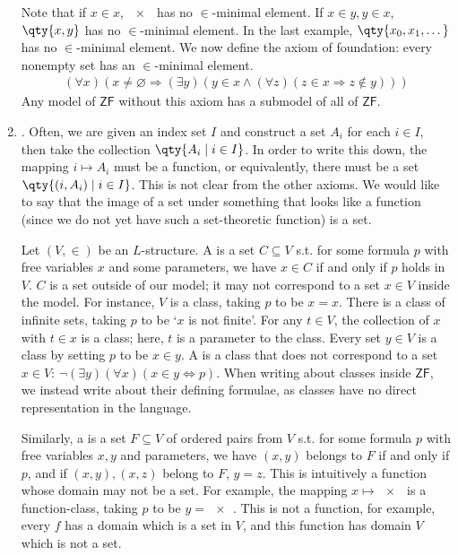 \begin{enumerate}
    Note that if $x \in x$, $\qty{x}$ has no $\in$-minimal element.
    If $x \in y, y \in x$, $\qty{x, y}$ has no $\in$-minimal element.
    In the last example, $\qty{x_0, x_1, \dots}$ has no $\in$-minimal element.
    We now define the axiom of foundation: every nonempty set has an $\in$-minimal element.
    \begin{align*}
        (\forall x)(x \neq \varnothing \Rightarrow (\exists y)(y \in x \wedge (\forall z)(z \in x \Rightarrow z \not\in y)))
    \end{align*}
    Any model of $\mathsf{ZF}$ without this axiom has a submodel of all of $\mathsf{ZF}$.
    \item {}.
    Often, we are given an index set $I$ and construct a set $A_i$ for each $i \in I$, then take the collection $\qty{A_i \mid i \in I}$.
    In order to write this down, the mapping $i \mapsto A_i$ must be a function, or equivalently, there must be a set $\qty{(i, A_i) \mid i \in I}$.
    This is not clear from the other axioms.
    We would like to say that the image of a set under something that looks like a function (since we do not yet have such a set-theoretic function) is a set.

    Let $(V, \in)$ be an $L$-structure.
    A  is a set $C \subseteq V$ s.t. for some formula $p$ with free variables $x$ and some parameters, we have $x \in C$ if and only if $p$ holds in $V$.
    $C$ is a set outside of our model; it may not correspond to a set $x \in V$ inside the model.
    For instance, $V$ is a class, taking $p$ to be $x = x$.
    There is a class of infinite sets, taking $p$ to be `$x$ is not finite'.
    For any $t \in V$, the collection of $x$ with $t \in x$ is a class; here, $t$ is a parameter to the class.
    Every set $y \in V$ is a class by setting $p$ to be $x \in y$.
    A  is a class that does not correspond to a set $x \in V$: $\neg(\exists y)(\forall x)(x \in y \Leftrightarrow p)$.
    When writing about classes inside $\mathsf{ZF}$, we instead write about their defining formulae, as classes have no direct representation in the language.

    Similarly, a  is a set $F \subseteq V$ of ordered pairs from $V$ s.t. for some formula $p$ with free variables $x, y$ and parameters, we have $(x, y)$ belongs to $F$ if and only if $p$, and if $(x, y), (x, z)$ belong to $F$, $y = z$.
    This is intuitively a function whose domain may not be a set.
    For example, the mapping $x \mapsto \qty{x}$ is a function-class, taking $p$ to be $y = \qty{x}$.
    This is not a function, for example, every $f$ has a domain which is a set in $V$, and this function has domain $V$ which is not a set.


\end{enumerate}
